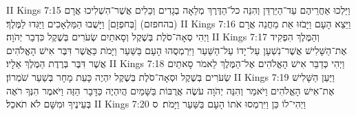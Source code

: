 II Kings 7:15	וַיֵּלְכוּ אַחֲרֵיהֶם עַד־הַיַּרְדֵּן וְהִנֵּה כל־הַדֶּרֶךְ מְלֵאָה בְגָדִים וְכֵלִים אֲשֶׁר־הִשְׁלִיכוּ אֲרָם (בהחפזם) [בְּחפְזָם] וַיָּשֻׁבוּ הַמַּלְאָכִים וַיַּגִּדוּ לַמֶּלֶךְ׃
II Kings 7:16	וַיֵּצֵא הָעָם וַיָּבֹזּוּ אֵת מַחֲנֵה אֲרָם וַיְהִי סְאָה־סֹלֶת בְּשֶׁקֶל וְסָאתַיִם שְׂעֹרִים בְּשֶׁקֶל כִּדְבַר יְהֹוָה׃
II Kings 7:17	וְהַמֶּלֶךְ הִפְקִיד אֶת־הַשָּׁלִישׁ אֲשֶׁר־נִשְׁעָן עַל־יָדוֹ עַל־הַשַּׁעַר וַיִּרְמְסֻהוּ הָעָם בַּשַּׁעַר וַיָּמֹת כַּאֲשֶׁר דִּבֶּר אִישׁ הָאֱלֹהִים אֲשֶׁר דִּבֶּר בְּרֶדֶת הַמֶּלֶךְ אֵלָיו׃
II Kings 7:18	וַיְהִי כְּדַבֵּר אִישׁ הָאֱלֹהִים אֶל־הַמֶּלֶךְ לֵאמֹר סָאתַיִם שְׂעֹרִים בְּשֶׁקֶל וּסְאָה־סֹלֶת בְּשֶׁקֶל יִהְיֶה כָּעֵת מָחָר בְּשַׁעַר שֹׁמְרוֹן׃
II Kings 7:19	וַיַּעַן הַשָּׁלִישׁ אֶת־אִישׁ הָאֱלֹהִים וַיֹּאמַר וְהִנֵּה יְהֹוָה עֹשֶׂה אֲרֻבּוֹת בַּשָּׁמַיִם הֲיִהְיֶה כַּדָּבָר הַזֶּה וַיֹּאמֶר הִנְּךָ רֹאֶה בְּעֵינֶיךָ וּמִשָּׁם לֹא תֹאכֵל׃
II Kings 7:20	וַיְהִי־לוֹ כֵּן וַיִּרְמְסוּ אֹתוֹ הָעָם בַּשַּׁעַר וַיָּמֹת׃ {ס}        
